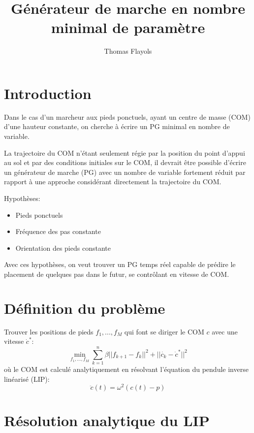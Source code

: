 \documentclass[10pt,a4paper]{article}
\begin{document}
\title{Générateur de marche en nombre minimal de paramètre}
\author{Thomas Flayols}
\maketitle
\section*{Introduction}
Dans le cas d'un marcheur aux pieds ponctuels, ayant un centre de masse (COM) d'une hauteur constante, on cherche à écrire un PG minimal en nombre de variable.

La  trajectoire du COM n'étant seulement régie par la position du point d’appui au sol et par des conditions initiales sur le COM, il devrait être possible d'écrire un générateur de marche (PG) avec un nombre de variable fortement réduit par rapport à une approche considérant directement la trajectoire du COM.

Hypothèses:
\begin{itemize}
\item Pieds ponctuels
\item Fréquence des pas constante
\item Orientation des pieds constante
\end{itemize}

Avec ces hypothèses, on veut trouver un PG temps réel capable de prédire le placement de quelques pas dans le futur, se contrôlant en vitesse de COM.
\section{Définition du problème}

Trouver les positions de pieds $f_1,...,f_M$ qui font se diriger le COM $c$ avec une vitesse $\dot{c}^*$:
\begin{equation}\label{problem}
\min_{ f_1,...,f_M} \sum\limits_{k=1}^n \beta||f_{k+1}-f_{k}||^2 + ||\dot{c_k}-\dot{c}^*||^2
\end{equation}
où le COM est calculé analytiquement en résolvant l'équation du pendule inverse linéarisé (LIP):
\begin{equation}\label{lip}
\ddot{c}(t)=\omega^2 (c(t)-p)
\end{equation}

\section{Résolution analytique du LIP}
\end{document}

